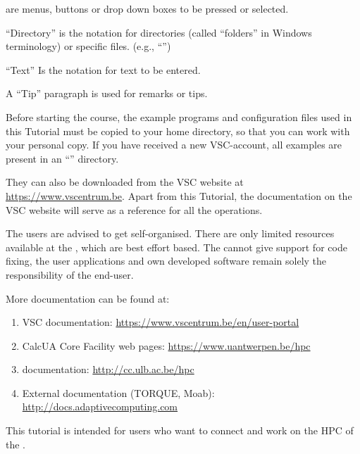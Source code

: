  are menus, buttons or drop down boxes to be pressed or selected.

``Directory'' is the notation for directories (called ``folders'' in
Windows terminology) or specific files. (e.g., ``\homedir'')

``Text'' Is the notation for text to be entered.

\begin{tip}
A ``Tip'' paragraph is used for remarks or tips.
\end{tip}


Before starting the course, the example programs and configuration files used in this Tutorial must be copied to your home directory, so that you can work with your personal copy. If you have received a new VSC-account, all examples are present in an ``\examplesdir'' directory.

\begin{prompt}
\end{prompt}

They can also be downloaded from the VSC website at
\url{https://www.vscentrum.be}.
Apart from this \hpc Tutorial, the documentation on the VSC website
will serve as a reference for all the
operations.


\begin{tip}
The users are advised to get self-organised. There are
only limited resources available at the \hpc, which are best effort based.
The \hpc cannot give support for code fixing, the user applications and own
developed software remain solely the responsibility of the end-user.
\end{tip}

More documentation can be found at:

\begin{enumerate}
  \item  VSC documentation: \url{https://www.vscentrum.be/en/user-portal}
  \ifantwerpen
    \item CalcUA Core Facility web pages: \url{https://www.uantwerpen.be/hpc}
  \fi
  \ifbrussel
    \item \hpcname documentation: \url{http://cc.ulb.ac.be/hpc}
  \fi
  \item  External documentation (TORQUE, Moab): \url{http://docs.adaptivecomputing.com}
\end{enumerate}

This tutorial is intended for users who want to connect and work on the HPC of the \strong{\university}.

